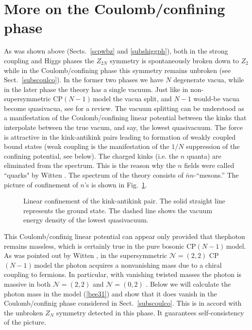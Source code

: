 \documentclass[epsfig,12pt]{article}
\newcommand{\cpn}{CP$(N-1)\,$}
\newcommand{\ntwot}{${\mathcal N}= \left(2,2\right) $ }
\newcommand{\ntwoo}{${\mathcal N}= \left(0,2\right) $ }
\begin{document}
{\section{More on the Coulomb/confining phase}
\label{moccp}
\setcounter{equation}{0}

As was shown above (Sects.~\ref{scpwbz} and \ref{subshiggph}), both in the strong coupling  and Higgs phases  
the $Z_{2N}$ symmetry is spontaneously broken down to $Z_2$ while in the Coulomb/confining phase this
symmetry remains unbroken (see Sect.~\ref{subscoulco}). In the former two phases we have $N$ degenerate vacua,
while in the later phase the theory has a single vacuum. Just like in non-supersymmetric
\cpn model \cite{GSY05} the vacua   split,  and $N-1$ would-be
vacua become quasivacua, see \cite{SYrev}
for a review. The vacuum splitting can be understood as a manifestation of the Coulomb/confining linear
potential between the kinks \cite{Coleman,W79} that interpolate between the true vacum, and say,
the lowest quasivacuum. The force is attractive in the kink-antikink pairs leading to  formation
of weakly coupled bound states (weak coupling is the
manifestation of the $1/N$ suppression of the confining potential, see below).
The charged kinks (i.e. the $n$ quanta) are eliminated from the spectrum. This is the reason
why the
$n$ fields were called ``quarks" by Witten \cite{W79}. The spectrum
of the theory consists of $\bar{n} n$-``mesons.'' The picture of
confinement of $n$'s is shown in Fig.~\ref{fig:conf}.

\begin{figure}
\epsfxsize=8cm
\centerline{}
\caption{\small 
Linear confinement of the kink-antikink pair.
The solid straight line represents the ground state.
The dashed line shows
the vacuum energy density of the lowest quasivacuum.}
\label{fig:conf}
\end{figure}

This Coulomb/confinig linear potential can appear only provided that thephoton remains massless,
which is certainly true in the pure bosonic \cpn model. As was pointed out by Witten \cite{W79},
in the supersymmetric \ntwot \cpn model the photon  acquires a nonvanishing
mass due to a chiral coupling to fermions.
In particular, with vanishing twisted masses the photon is massive in both \ntwot \cite{W79} and
\ntwoo \cite{SYhet}. Below we will calculate the photon mass in the model (\ref{bee31}) and
show that it does vanish in the Coulomb/confinig phase considered in Sect.~\ref{subscoulco}.
This is in accord with the unbroken $Z_N$ symmetry detected in this phase. It guarantees self-consistency
of the picture.

}
\end{document}
